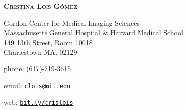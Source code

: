 \documentclass[letterpaper]{article}
\def\nome#1{\begin{center} \begin{Large}\textbf{#1}\end{Large}\end{center}\vspace{0.3cm}}
\begin{document}
\nome{\textsc{Cristina Lois G\'omez}}


\begin{minipage}[t]{0.6\textwidth}


\hspace*{1.3cm} Gordon Center for Medical Imaging Sciences\\
 \hspace*{1.3cm} Massachusetts General Hospital \& Harvard Medical School \\
 \hspace*{1.3cm} 149 13th Street, Room 10018 \\
 \hspace*{1.3cm} Charlestown MA, 02129  \\
\end{minipage}
\hfill
\begin{minipage}[t]{0.32\textwidth}
    \vfill
\raggedright phone: (617)-319-3615 \\
\raggedright email: \href{mailto:clois@mit.edu}{\texttt{clois@mit.edu}}\\
\raggedright web: \href{http://bit.ly/crislois}{\texttt{bit.ly/crislois}}\\
\end{minipage}
\end{document}
